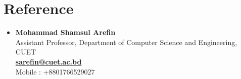 \documentclass[letterpaper,11pt]{article}
\newcommand{\resumeSubHeadingListStart}{\begin{itemize}[leftmargin=*]}
\newcommand{\resumeSubHeadingListEnd}{\end{itemize}}
\begin{document}
%

\section{Reference}
 \resumeSubHeadingListStart
  \item  \textbf{Mohammad Shamsul Arefin} \\Assistant Professor, Department of Computer Science and Engineering, CUET\\
  \href{mailto:sarefin@cuet.ac.bd}{\textbf{sarefin@cuet.ac.bd}}  \\
  Mobile : +8801766529027 \\
   
 \resumeSubHeadingListEnd


\end{document}
